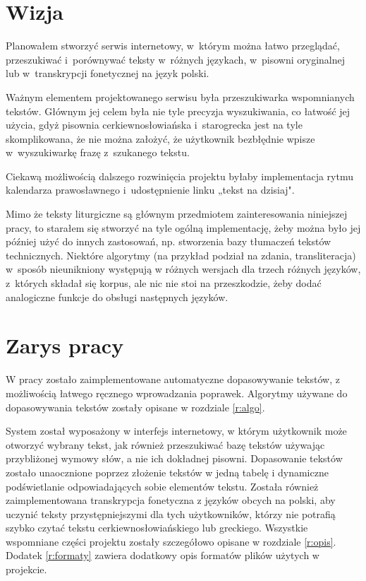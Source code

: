 \documentclass{pracamgr}
\begin{document}
\section*{Wizja}

Planowałem stworzyć serwis internetowy, w~którym można łatwo
przeglądać, przeszukiwać i~porównywać teksty w~różnych językach,
w~pisowni oryginalnej lub w~transkrypcji fonetycznej na język polski.

Ważnym elementem projektowanego serwisu była przeszukiwarka
wspomnianych tekstów. Głównym jej celem była nie tyle precyzja
wyszukiwania, co łatwość jej użycia, gdyż pisownia cerkiewno\-{}słowiańska
i~starogrecka jest na tyle skomplikowana, że nie można założyć, że
użytkownik bezbłędnie wpisze w~wyszukiwarkę frazę z~szukanego tekstu.

Ciekawą możliwością dalszego rozwinięcia projektu byłaby implementacja
rytmu kalendarza prawosławnego i~udostępnienie linku „tekst na
dzisiaj".

Mimo że teksty liturgiczne są głównym przedmiotem zainteresowania
niniejszej pracy, to starałem się stworzyć na tyle ogólną
implementację, żeby można było jej później użyć do innych zastosowań,
np. stworzenia bazy tłumaczeń tekstów technicznych. Niektóre algorytmy
(na przykład podział na zdania, transliteracja) w~sposób nieunikniony
występują w różnych wersjach dla trzech różnych języków, z~których
składał się korpus, ale nic nie stoi na przeszkodzie, żeby dodać
analogiczne funkcje do obsługi następnych języków.


\section*{Zarys pracy}

W pracy zostało zaimplementowane automatyczne dopasowywanie tekstów, z
możliwością łatwego ręcznego wprowadzania poprawek. Algorytmy używane
do dopasowywania tekstów zostały opisane w rozdziale \ref{r:algo}.

System został wyposażony w interfejs internetowy, w którym użytkownik
może otworzyć wybrany tekst, jak również przeszukiwać bazę tekstów
używając przybliżonej wymowy słów, a nie ich dokładnej
pisowni. Dopasowanie tekstów zostało unaocznione poprzez złożenie
tekstów w jedną tabelę i dynamiczne podświetlanie odpowiadających
sobie elementów tekstu. Została również zaimplementowana transkrypcja
fonetyczna z języków obcych na polski, aby uczynić teksty
przystępniejszymi dla tych użytkowników, którzy nie potrafią szybko
czytać tekstu cerkiewno\-{}słowiańskiego lub greckiego. Wszystkie
wspomniane części projektu zostały szczegółowo opisane w rozdziale
\ref{r:opis}. Dodatek \ref{r:formaty} zawiera dodatkowy opis formatów
plików użytych w projekcie.
\end{document}
